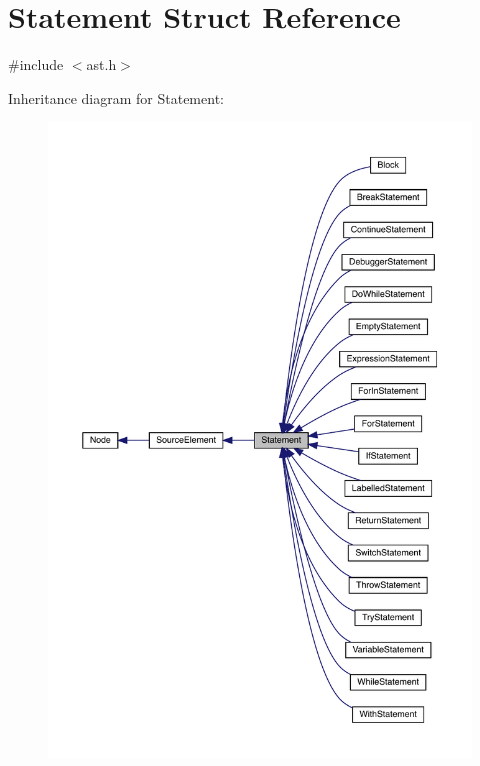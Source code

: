 \hypertarget{struct_statement}{}\section{Statement Struct Reference}
\label{struct_statement}


{\ttfamily \#include $<$ast.\+h$>$}



Inheritance diagram for Statement\+:
\nopagebreak
\begin{figure}[H]
\begin{center}
\leavevmode
\includegraphics[width=350pt]{struct_statement__inherit__graph}
\end{center}
\end{figure}


